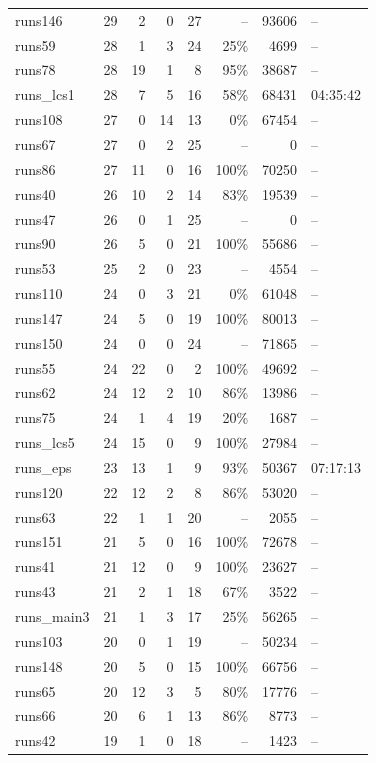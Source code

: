 \begin{longtable}{@{}lrrrrrrl@{}}
runs146 & 29 & 2 & 0 & 27 & -- & 93606 & -- \\
runs59 & 28 & 1 & 3 & 24 & 25\% & 4699 & -- \\
runs78 & 28 & 19 & 1 & 8 & 95\% & 38687 & -- \\
runs\_lcs1 & 28 & 7 & 5 & 16 & 58\% & 68431 & 04:35:42 \\
runs108 & 27 & 0 & 14 & 13 & 0\% & 67454 & -- \\
runs67 & 27 & 0 & 2 & 25 & -- & 0 & -- \\
runs86 & 27 & 11 & 0 & 16 & 100\% & 70250 & -- \\
runs40 & 26 & 10 & 2 & 14 & 83\% & 19539 & -- \\
runs47 & 26 & 0 & 1 & 25 & -- & 0 & -- \\
runs90 & 26 & 5 & 0 & 21 & 100\% & 55686 & -- \\
runs53 & 25 & 2 & 0 & 23 & -- & 4554 & -- \\
runs110 & 24 & 0 & 3 & 21 & 0\% & 61048 & -- \\
runs147 & 24 & 5 & 0 & 19 & 100\% & 80013 & -- \\
runs150 & 24 & 0 & 0 & 24 & -- & 71865 & -- \\
runs55 & 24 & 22 & 0 & 2 & 100\% & 49692 & -- \\
runs62 & 24 & 12 & 2 & 10 & 86\% & 13986 & -- \\
runs75 & 24 & 1 & 4 & 19 & 20\% & 1687 & -- \\
runs\_lcs5 & 24 & 15 & 0 & 9 & 100\% & 27984 & -- \\
runs\_eps & 23 & 13 & 1 & 9 & 93\% & 50367 & 07:17:13 \\
runs120 & 22 & 12 & 2 & 8 & 86\% & 53020 & -- \\
runs63 & 22 & 1 & 1 & 20 & -- & 2055 & -- \\
runs151 & 21 & 5 & 0 & 16 & 100\% & 72678 & -- \\
runs41 & 21 & 12 & 0 & 9 & 100\% & 23627 & -- \\
runs43 & 21 & 2 & 1 & 18 & 67\% & 3522 & -- \\
runs\_main3 & 21 & 1 & 3 & 17 & 25\% & 56265 & -- \\
runs103 & 20 & 0 & 1 & 19 & -- & 50234 & -- \\
runs148 & 20 & 5 & 0 & 15 & 100\% & 66756 & -- \\
runs65 & 20 & 12 & 3 & 5 & 80\% & 17776 & -- \\
runs66 & 20 & 6 & 1 & 13 & 86\% & 8773 & -- \\
runs42 & 19 & 1 & 0 & 18 & -- & 1423 & -- \\

\end{longtable}
